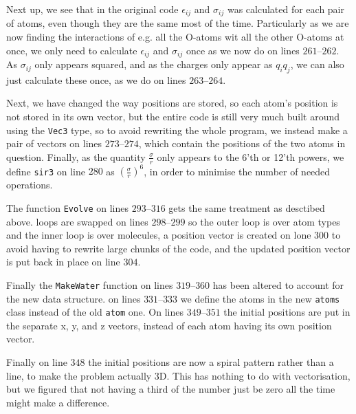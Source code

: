 \documentclass{article}
\begin{document}
Next up, we see that in the original code $\epsilon_{ij}$ and $\sigma_{ij}$ was calculated for each pair of atoms, even though they are the same most of the time. Particularly as we are now finding the interactions of e.g. all the O-atoms wit all the other O-atoms at once, we only need to calculate $\epsilon_{ij}$ and $\sigma_{ij}$ once as we now do on lines $261$--$262$. As $\sigma_{ij}$ only appears squared, and as the charges only appear as $q_iq_j$, we can also just calculate these once, as we do on lines $263$--$264$.

Next, we have changed the way positions are stored, so each atom's position is not stored in its own vector, but the entire code is still very much built around using the \texttt{Vec3} type, so to avoid rewriting the whole program, we instead make a pair of vectors on lines $273$--$274$, which contain the positions of the two atoms in question. Finally, as the quantity $\frac{\sigma}{r}$ only appears to the 6'th or 12'th powers, we define \texttt{sir3} on line $280$ as $\left(\frac{\sigma}{r}\right)^6$, in order to minimise the number of needed operations.

The function \texttt{Evolve} on lines $293$--$316$ gets the same treatment as desctibed above. loops are swapped on lines $298$--$299$ so the outer loop is over atom types and the inner loop is over molecules, a position vector is created on lone $300$ to avoid having to rewrite large chunks of the code, and the updated position vector is put back in place on line $304$.

Finally the \texttt{MakeWater} function on lines $319$--$360$ has been altered to account for the new data structure. on lines $331$--$333$ we define the atoms in the new \texttt{atoms} class instead of the old \texttt{atom} one. On lines $349$--$351$ the initial positions are put in the separate x, y, and z vectors, instead of each atom having its own position vector. 

Finally on line $348$ the initial positions are now a spiral pattern rather than a line, to make the problem actually 3D. This has nothing to do with vectorisation, but we figured that not having a third of the number just be zero all the time might make a difference.
\end{document}
